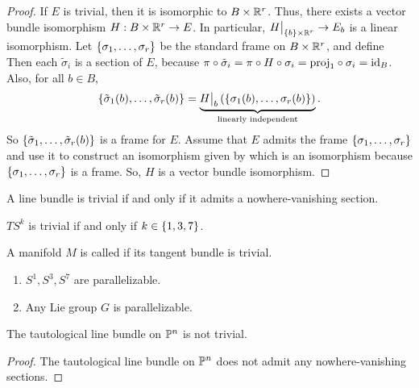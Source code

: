 \documentclass[main.tex]{subfiles}
\begin{document}
 \begin{proof}
    \impliespf If $E$ is trivial, then it is isomorphic to $B \times \mathbb{R}^r$. Thus, there exists a vector bundle isomorphism $H: B \times \mathbb{R}^r \to E$. In particular, $H\big|_{\left\{b\right\}\times \mathbb{R}^r} \to E_b$ is a linear isomorphism. Let $\left\{\sigma_1, \dots, \sigma_r\right\}$ be the standard frame on $B \times \mathbb{R}^r$, and define 
    Then each $\tilde{\sigma}_i$ is a section of $E$, because $\pi \circ \tilde{\sigma}_i = \pi \circ H \circ \sigma_i = \text{proj}_1 \circ \sigma_i = \text{id}_{B}$. Also, for all $b \in B$, \[\left\{\tilde{\sigma}_1(b), \dots, \tilde{\sigma}_r(b)\right\} = \underbrace{H\big|_{b} \left( \left\{\sigma_1(b), \dots, \sigma_r(b)\right\} \right)}_{\text{linearly independent}}.\] So $\left\{\tilde{\sigma}_1, \dots, \tilde{\sigma}_r(b)\right\}$ is a frame for $E$. \impliedpf Assume that $E$ admits the frame $\left\{\sigma_1, \dots, \sigma_r\right\}$ and use it to construct an isomorphism given by
     which is an isomorphism because $\left\{\sigma_1, \dots, \sigma_r\right\}$ is a frame. So, $H$ is a vector bundle isomorphism.
 \end{proof}
 
 \begin{cor}
 A line bundle is trivial if and only if it admits a nowhere-vanishing section. 
 \end{cor}
 
 \begin{cor}
 $TS^k$ is trivial if and only if $k \in \left\{1,3,7\right\}$.
 \end{cor}

\begin{defn}
 A manifold $M$ is called  if its tangent bundle is trivial. 
\end{defn}

\begin{exmp}
    \begin{enumerate}
        \item $S^1, S^3, S^7$ are parallelizable.
        \item Any Lie group $G$ is parallelizable.
    \end{enumerate}
\end{exmp}

\begin{prop}
 The tautological line bundle on $\mathbb{P}^n$ is not trivial.
\end{prop}
\begin{proof}
The tautological line bundle on $\mathbb{P}^n$ does not admit any nowhere-vanishing sections.
\end{proof}

 
 
\end{document}
